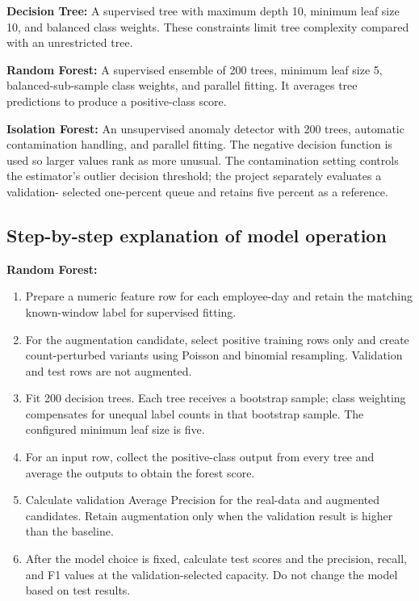 \documentclass[12pt,a4paper,oneside]{report}
\begin{document}
\textbf{Decision Tree:} A supervised tree with maximum depth 10,
minimum leaf size 10, and balanced class weights. These constraints
limit tree complexity compared with an unrestricted tree.

\textbf{Random Forest:} A supervised ensemble of 200 trees, minimum leaf
size 5, balanced-sub-sample class weights, and parallel fitting. It
averages tree predictions to produce a positive-class score.

\textbf{Isolation Forest:} An unsupervised anomaly detector with 200
trees, automatic contamination handling, and parallel fitting. The
negative decision function is used so larger values rank as more
unusual. The contamination setting controls the estimator's outlier
decision threshold; the project separately evaluates a validation-
selected one-percent queue and retains five percent as a reference.

\subsection{Step-by-step explanation of model operation}
\textbf{Random Forest:}
\begin{enumerate}
  \item Prepare a numeric feature row for each employee-day and retain
        the matching known-window label for supervised fitting.
  \item For the augmentation candidate, select positive training rows
        only and create count-perturbed variants using Poisson and
        binomial resampling. Validation and test rows are not augmented.
  \item Fit 200 decision trees. Each tree receives a bootstrap sample;
        class weighting compensates for unequal label counts in that
        bootstrap sample. The configured minimum leaf size is five.
  \item For an input row, collect the positive-class output from every
        tree and average the outputs to obtain the forest score.
  \item Calculate validation Average Precision for the real-data and
        augmented candidates. Retain augmentation only when the
        validation result is higher than the baseline.
  \item After the model choice is fixed, calculate test scores and the
        precision, recall, and F1 values at the validation-selected
        capacity. Do not change the model based on test results.
\end{enumerate}
\end{document}
